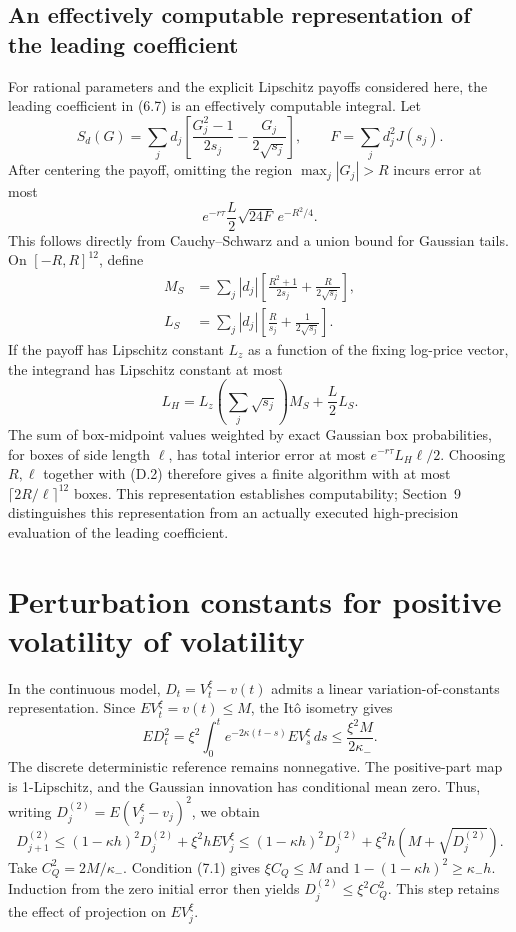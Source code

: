 \documentclass[11pt,a4paper]{article}
\begin{document}
\subsection{An effectively computable representation of the leading coefficient}

For rational parameters and the explicit Lipschitz payoffs considered here, the leading
coefficient in (6.7) is an effectively computable integral. Let
\[
S_d(G)=\sum_jd_j\left[\frac{G_j^2-1}{2s_j}-\frac{G_j}{2\sqrt{s_j}}\right],
\qquad F=\sum_jd_j^2J(s_j).
\]
After centering the payoff, omitting the region \(\max_j|G_j|>R\) incurs error at most
\[
e^{-r\tau}\frac L2\sqrt{24F}\,e^{-R^2/4}.
\tag{D.2}
\]
This follows directly from Cauchy--Schwarz and a union bound for Gaussian tails.
On \([-R,R]^{12}\), define
\[
\begin{aligned}
M_S&=\sum_j|d_j|\left[\frac{R^2+1}{2s_j}+\frac R{2\sqrt{s_j}}\right],\\
L_S&=\sum_j|d_j|\left[\frac R{s_j}+\frac1{2\sqrt{s_j}}\right].
\end{aligned}
\]
If the payoff has Lipschitz constant \(L_z\) as a function of the fixing log-price vector,
the integrand has Lipschitz constant at most
\[
L_H=L_z\left(\sum_j\sqrt{s_j}\right)M_S+\frac L2L_S.
\]
The sum of box-midpoint values weighted by exact Gaussian box probabilities, for boxes
of side length \(\ell\), has total interior error at most
\(e^{-r\tau}L_H\ell/2\).
Choosing \(R,\ell\) together with (D.2) therefore gives a finite algorithm with at most
\(\lceil2R/\ell\rceil^{12}\) boxes.
This representation establishes computability; Section~9 distinguishes this
representation from an actually executed high-precision evaluation of the leading coefficient.

\section{Perturbation constants for positive volatility of volatility}

In the continuous model, \(D_t=V_t^\xi-v(t)\) admits a linear variation-of-constants
representation. Since \(EV_t^\xi=v(t)\le M\), the It\^o isometry gives
\[
ED_t^2=\xi^2\int_0^te^{-2\kappa(t-s)}EV_s^\xi\,ds
\le\frac{\xi^2M}{2\kappa_-}.
\tag{E.1}
\]
The discrete deterministic reference remains nonnegative.
The positive-part map is 1-Lipschitz, and the Gaussian innovation has conditional mean
zero. Thus, writing \(D_j^{(2)}=E(V_j^\xi-v_j)^2\), we obtain
\[
D_{j+1}^{(2)}
\le(1-\kappa h)^2D_j^{(2)}+\xi^2hEV_j^\xi
\le(1-\kappa h)^2D_j^{(2)}
+\xi^2h(M+\sqrt{D_j^{(2)}}).
\tag{E.2}
\]
Take \(C_Q^2=2M/\kappa_-\).
Condition (7.1) gives \(\xi C_Q\le M\) and
\(1-(1-\kappa h)^2\ge\kappa_-h\).
Induction from the zero initial error then yields
\(D_j^{(2)}\le\xi^2C_Q^2\).
This step retains the effect of projection on \(EV_j^\xi\).
\end{document}
